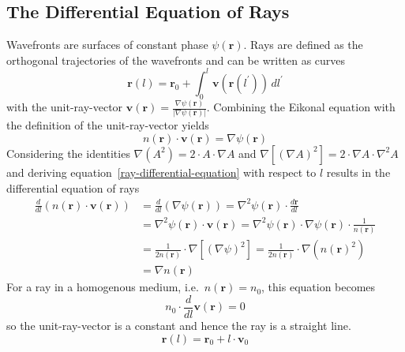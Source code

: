 \subsection{The Differential Equation of Rays}
Wavefronts are surfaces of constant phase \(\psi(\bm{r})\).
Rays are defined as the orthogonal trajectories of the wavefronts and can be written as curves
\begin{equation}
    \bm{r}(l) = \bm{r}_0 + \int_{0}^{l} \bm{v}(\bm{r}(l^{\prime})) \, dl^{\prime}
\end{equation}
with the unit-ray-vector \(\bm{v}(\bm{r}) = \frac{\nabla \psi(\bm{r})}{|\nabla \psi(\bm{r})|}\).
Combining the Eikonal equation with the definition of the unit-ray-vector yields
\begin{equation}\label{ray-differential-equation}
    n(\bm{r}) \cdot \bm{v}(\bm{r}) = \nabla \psi(\bm{r})
\end{equation}
Considering the identities \(\nabla(A^2)= 2 \cdot A \cdot \nabla A\) and \(\nabla[{(\nabla A)}^2] = 2 \cdot \nabla A \cdot \nabla^2 A\) and deriving equation~\eqref{ray-differential-equation} with respect to \(l\) results in the differential equation of rays~\parencite{born_foundations_1999}
\begin{align}
    \frac{d}{dl}(n(\bm{r}) \cdot \bm{v}(\bm{r})) &= \frac{d}{dl}(\nabla \psi(\bm{r})) = \nabla^2 \psi(\bm{r}) \cdot \frac{d\bm{r}}{dl} \nonumber \\
    &= \nabla^2 \psi(\bm{r}) \cdot \bm{v}(\bm{r}) = \nabla^2 \psi(\bm{r}) \cdot \nabla \psi(\bm{r}) \cdot \frac{1}{n(\bm{r})} \nonumber \\
    &= \frac{1}{2n(\bm{r})} \cdot \nabla[{(\nabla \psi)}^2] = \frac{1}{2n(\bm{r})} \cdot \nabla({n(\bm{r})}^2) \nonumber \\
    &= \nabla n(\bm{r})
\end{align}
For a ray in a homogenous medium, i.e.~\(n(\bm{r}) = n_0\), this equation becomes
\begin{equation}
    n_0 \cdot \frac{d}{dl}\bm{v}(\bm{r}) = 0
\end{equation}
so the unit-ray-vector is a constant and hence the ray is a straight line.
\begin{equation}
    \bm{r}(l) = \bm{r}_0 + l \cdot \bm{v}_0
\end{equation}


